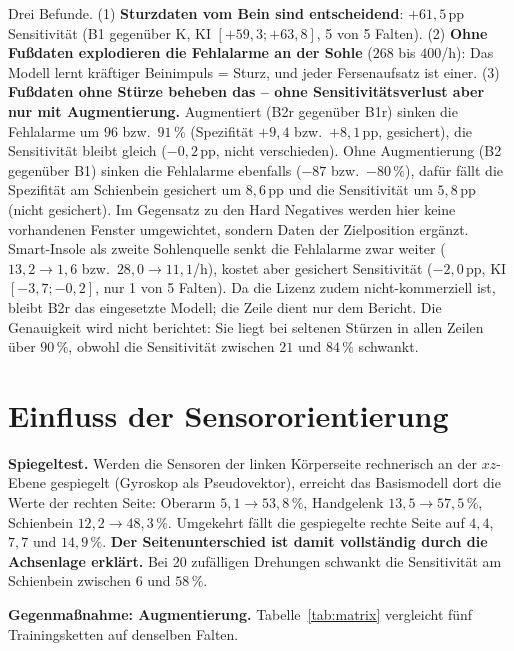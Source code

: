 \documentclass[11pt,a4paper,oneside,parskip=half,open=any,
               numbers=noenddot,listof=totoc,bibliography=totoc]{scrreprt}
\begin{document}
Drei Befunde. (1) \textbf{Sturzdaten vom Bein sind entscheidend}:
$+61{,}5$\,pp Sensitivität (B1 gegenüber K, KI $[+59{,}3; +63{,}8]$,
5 von 5 Falten). (2) \textbf{Ohne Fußdaten explodieren die Fehlalarme an
der Sohle} ($268$ bis $400$/h): Das Modell lernt \glqq kräftiger
Beinimpuls = Sturz\grqq{}, und jeder Fersenaufsatz ist einer.
(3) \textbf{Fußdaten ohne Stürze beheben das -- ohne Sensitivitätsverlust
aber nur mit Augmentierung.} Augmentiert (B2r gegenüber B1r) sinken die
Fehlalarme um $96$ bzw.\ $91\,\%$ (Spezifität $+9{,}4$ bzw.\
$+8{,}1$\,pp, gesichert), die Sensitivität bleibt gleich ($-0{,}2$\,pp,
nicht verschieden). Ohne Augmentierung (B2 gegenüber B1) sinken die
Fehlalarme ebenfalls ($-87$ bzw.\ $-80\,\%$), dafür fällt die Spezifität
am Schienbein gesichert um $8{,}6$\,pp und die Sensitivität um
$5{,}8$\,pp (nicht gesichert). Im Gegensatz zu den Hard Negatives werden
hier keine vorhandenen Fenster umgewichtet, sondern Daten der
Zielposition ergänzt. Smart-Insole als zweite Sohlenquelle senkt die Fehlalarme zwar
weiter ($13{,}2 \rightarrow 1{,}6$ bzw.\ $28{,}0 \rightarrow 11{,}1$/h),
kostet aber gesichert Sensitivität ($-2{,}0$\,pp, KI $[-3{,}7; -0{,}2]$,
nur 1 von 5 Falten). Da die Lizenz zudem nicht-kommerziell ist, bleibt
B2r das eingesetzte Modell; die Zeile dient nur dem Bericht.
Die Genauigkeit wird nicht berichtet: Sie liegt bei seltenen Stürzen in
allen Zeilen über $90\,\%$, obwohl die Sensitivität zwischen $21$ und
$84\,\%$ schwankt.

\section{Einfluss der Sensororientierung}
\label{sec:orient}
\textbf{Spiegeltest.} Werden die Sensoren der linken Körperseite
rechnerisch an der $xz$-Ebene gespiegelt (Gyroskop als Pseudovektor),
erreicht das Basismodell dort die Werte der rechten Seite: Oberarm
$5{,}1 \rightarrow 53{,}8\,\%$, Handgelenk $13{,}5 \rightarrow 57{,}5\,\%$,
Schienbein $12{,}2 \rightarrow 48{,}3\,\%$. Umgekehrt fällt die gespiegelte
rechte Seite auf $4{,}4$, $7{,}7$ und $14{,}9\,\%$. \textbf{Der
Seitenunterschied ist damit vollständig durch die Achsenlage erklärt.}
Bei 20 zufälligen Drehungen schwankt die Sensitivität am Schienbein
zwischen $6$ und $58\,\%$.

\textbf{Gegenmaßnahme: Augmentierung.} Tabelle~\ref{tab:matrix}
vergleicht fünf Trainingsketten auf denselben Falten.
\end{document}
